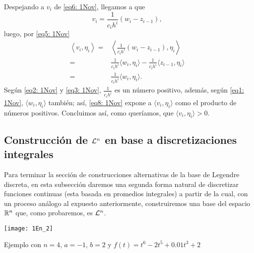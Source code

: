 \begin{itemize}
Despejando a $v_{i}$ de \eqref{eq6: 1Nov}, llegamos a que
\begin{equation}
\label{eq7: 1Nov}
v_{i}= \frac{1}{c_{i}h^{i}} \left( w_{i} -  z_{i-1} \right),
\end{equation}
luego, por \eqref{eq5: 1Nov}
\begin{align}
\label{eq8: 1Nov}
\left\langle v_{i}, \eta_{i} \right\rangle = & 
\left\langle \frac{1}{c_{i}h^{i}} \left( w_{i} -  z_{i-1} \right), \eta_{i} 
 \right\rangle \nonumber \\
= & \frac{1}{c_{i}h^{i}} \langle w_{i}, \eta_{i} \rangle -
\frac{1}{c_{i}h^{i}} \langle z_{i-1}, \eta_{i} \rangle \nonumber \\
= & \frac{1}{c_{i}h^{i}} \langle w_{i}, \eta_{i} \rangle.
\end{align}
Según 
\eqref{eq2: 1Nov} y 
\eqref{eq3: 1Nov}, $\frac{1}{c_{i}h^{i}}$ es
un número positivo, además, según 
\eqref{eq1: 1Nov}, $\langle w_{i}, \eta_{i} \rangle$ también;
así, \eqref{eq8: 1Nov} expone a $\langle v_{i}, \eta_{i} \rangle$
como el producto de números positivos. 
Concluimos así, como queríamos,
que $\langle v_{i}, \eta_{i} \rangle>0$.
\QEDB
\vspace{0.2cm}


\end{itemize}

\subsection{Construcción de $\mathcal{L}^{n}$ en base a discretizaciones integrales}
\label{Construcción de Ln en base a discretizaciones con sumas integrales}
Para terminar la sección de construcciones alternativas
de la base de Legendre discreta,
en esta subsección daremos una segunda
forma natural de discretizar funciones continuas
(esta basada en promedios integrales) a partir de 
la cual, con un proceso análogo al expuesto
anteriormente,
construiremos una base del espacio $\mathbb{R}^{n}$
que, como probaremos, es $\mathcal{L}^{n}$.

\begin{marginfigure}
\texttt{[image: 1En\_2]} 
		\caption{Ejemplo con $n=4$, $a=-1$, $b=2$ y
		$f(t)= t^{6}-2t^{5}+0.01t^{3}+2$}
\end{marginfigure}



